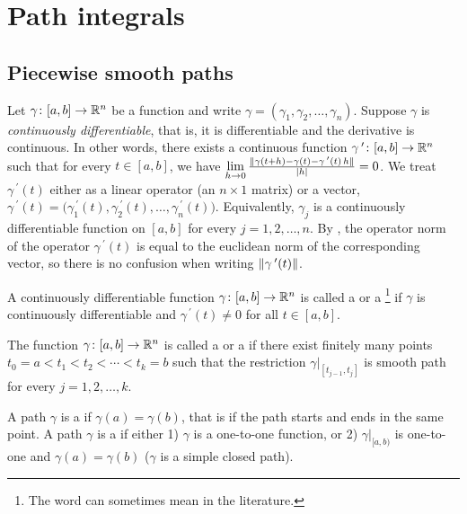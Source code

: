 
\sectionnewpage
\section{Path integrals}
\label{sec:pathintegral}


\subsection{Piecewise smooth paths}

Let $\gamma \colon [a,b] \to {\mathbb{R}}^n$ be a function and write
$\gamma = (\gamma_1,\gamma_2,\ldots,\gamma_n)$. 
Suppose $\gamma$ is 
\emph{continuously differentiable},
that is,
it is differentiable and the derivative is continuous.
In other words, there exists a continuous function $\gamma^{\:\prime} \colon [a,b]
\to {\mathbb{R}}^n$ such that for every $t \in [a,b]$, we have
$\lim\limits_{h \to 0}
\frac{\lVert {\gamma(t+h)-\gamma(t) - \gamma^{\:\prime}(t) \, h} \rVert}{\lvert {h} \rvert} = 0$.
We treat
$\gamma^{\:\prime}(t)$ either as a linear operator (an $n \times 1$ matrix) or
a vector,
$\gamma^{\:\prime}(t) =
\bigl( \gamma_1^{\:\prime}(t), \gamma_2^{\:\prime}(t), \ldots,
\gamma_n^{\:\prime}(t) \bigr)$.
Equivalently, 
$\gamma_j$ is a continuously differentiable function on $[a,b]$
for every $j=1,2,\ldots,n$.
By , the operator norm of
the operator $\gamma^{\:\prime}(t)$ is equal to
the euclidean norm of the corresponding vector, so there is no
confusion when writing $\lVert {\gamma^{\:\prime}(t)} \rVert$.

\begin{defn}
A continuously differentiable function $\gamma \colon [a,b] \to {\mathbb{R}}^n$ is
called a \emph{}
or a
\emph{}\footnote{The
word  can sometimes mean
 in the literature.}
if
$\gamma$ is continuously differentiable and
$\gamma^{\:\prime}(t) \not= 0$ for all $t \in [a,b]$.

The function $\gamma \colon [a,b] \to {\mathbb{R}}^n$ is called a
\emph{} or a
\emph{}
if there exist finitely many points
$t_0 = a < t_1 < t_2 < \cdots < t_k = b$ such that
the restriction $\gamma|_{[t_{j-1},t_j]}$ is smooth path for every
$j=1,2,\ldots,k$.

A path $\gamma$ is 
a \emph{} if $\gamma(a) = \gamma(b)$, that is
if the path starts and ends in the same point.
A path $\gamma$ is a \emph{} if 
either 1) $\gamma$ is a one-to-one function, or 2)
$\gamma|_{[a,b)}$ is one-to-one and $\gamma(a)=\gamma(b)$ ($\gamma$ is a
simple closed path).
\end{defn}


